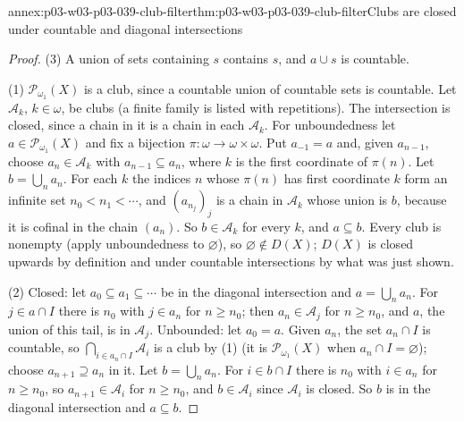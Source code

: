 \begin{annexitem}{annex:p03-w03-p03-039-club-filter}{thm:p03-w03-p03-039-club-filter}{Clubs are closed under countable and diagonal intersections}
\begin{proof}
(3) A union of sets containing \(s\) contains \(s\), and \(a\cup s\) is
countable.

(1) \(\mathcal P_{\omega_1}(X)\) is a club, since a countable union of
countable sets is countable. Let \(\mathcal A_k\), \(k\in\omega\), be clubs
(a finite family is listed with repetitions). The intersection is closed,
since a chain in it is a chain in each \(\mathcal A_k\). For unboundedness
let \(a\in\mathcal P_{\omega_1}(X)\) and fix a bijection
\(\pi:\omega\to\omega\times\omega\). Put \(a_{-1}=a\) and, given
\(a_{n-1}\), choose \(a_n\in\mathcal A_k\) with \(a_{n-1}\subseteq a_n\),
where \(k\) is the first coordinate of \(\pi(n)\). Let \(b=\bigcup_na_n\).
For each \(k\) the indices \(n\) whose \(\pi(n)\) has first coordinate \(k\)
form an infinite set \(n_0<n_1<\cdots\), and \((a_{n_j})_j\) is a chain in
\(\mathcal A_k\) whose union is \(b\), because it is cofinal in the chain
\((a_n)\). So \(b\in\mathcal A_k\) for every \(k\), and \(a\subseteq b\).
Every club is nonempty (apply unboundedness to \(\varnothing\)), so
\(\varnothing\notin D(X)\); \(D(X)\) is closed upwards by definition and
under countable intersections by what was just shown.

(2) Closed: let \(a_0\subseteq a_1\subseteq\cdots\) be in the diagonal
intersection and \(a=\bigcup_na_n\). For \(j\in a\cap I\) there is \(n_0\)
with \(j\in a_n\) for \(n\ge n_0\); then \(a_n\in\mathcal A_j\) for
\(n\ge n_0\), and \(a\), the union of this tail, is in \(\mathcal A_j\).
Unbounded: let \(a_0=a\). Given \(a_n\), the set \(a_n\cap I\) is countable,
so \(\bigcap_{i\in a_n\cap I}\mathcal A_i\) is a club by (1) (it is
\(\mathcal P_{\omega_1}(X)\) when \(a_n\cap I=\varnothing\)); choose
\(a_{n+1}\supseteq a_n\) in it. Let \(b=\bigcup_na_n\). For \(i\in b\cap I\)
there is \(n_0\) with \(i\in a_n\) for \(n\ge n_0\), so \(a_{n+1}\in\mathcal A_i\)
for \(n\ge n_0\), and \(b\in\mathcal A_i\) since \(\mathcal A_i\) is closed.
So \(b\) is in the diagonal intersection and \(a\subseteq b\).
\end{proof}
\end{annexitem}


